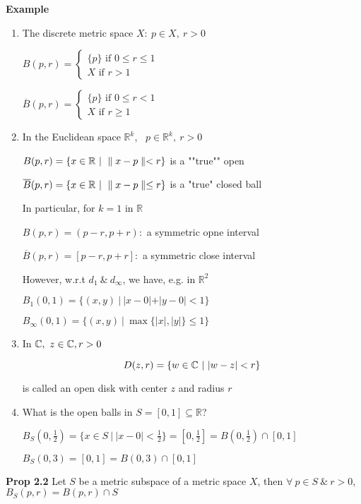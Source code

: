 \textbf{Example}$ $

\begin{enumerate}
	\item The discrete metric space $X:~ p \in X,~r>0$
	
	$B(p,r) = \begin{cases}
		\{p\} \text{ if } 0 \leq r \leq 1\\ X \text{ if } r > 1
	\end{cases}$
	
	$\overline{B}(p,r) = \begin{cases}
		\{p\} \text{ if } 0 \leq r < 1\\ X \text{ if } r \geq 1
	\end{cases}$
	
	\item In the Euclidean space $\mathbb R^k$,~ $p \in \mathbb R^k,~r>0$
	
	$B(p,r) = \{x \in \mathbb R~|~ \parallel x-p \parallel < r \}$ is a ""true"" open
	
	$\overline{B}(p,r) = \{ x \in \mathbb R ~|~ \parallel x - p \parallel \leq r \} $ is a "true" closed ball
	
	In particular, for $k = 1$ in $\mathbb R$
	
	$B(p,r) = (p-r,p+r):$ a symmetric opne interval
	
	$\overline{B}(p,r) = [p-r,p+r]:$ a symmetric close interval
	
	However, w.r.t $d_1 ~\&~ d_{\infty}$, we have, e.g. in $\mathbb R^2$
	
	$B_1(0,1) = \{(x,y)~|~|x-0|+|y-0|<1\}$
	
	$B_{\infty}(0,1) = \{(x,y) ~|~ \max\{|x|,|y|\} \leq 1\}$
	\item In $\mathbb{C},~z \in \mathbb{C} , r>0$
	
	$$D(z,r) = \{w \in \mathbb{C} ~|~ |w-z| < r\}$$
	
	is called an open disk with center $z$ and radius $r$ 
	
	
	\item What is the open balls in $S = [0,1] \subseteq \mathbb R$?
	
	$B_S(0,\frac{1}{2}) = \{x \in S ~|~ |x - 0| < \frac{1}{2}\} = [0,\frac{1}{2}] = B(0,\frac{1}{2}) \cap [0,1]$
	
	$B_S(0,3) = [0,1] = B(0,3) \cap [0,1]$

\end{enumerate}

\textbf{Prop 2.2} Let $S$ be a metric subspace of a metric space $X$, then $\forall ~p \in S ~\&~ r > 0$, $B_S(p,r) = B(p,r) \cap S$


